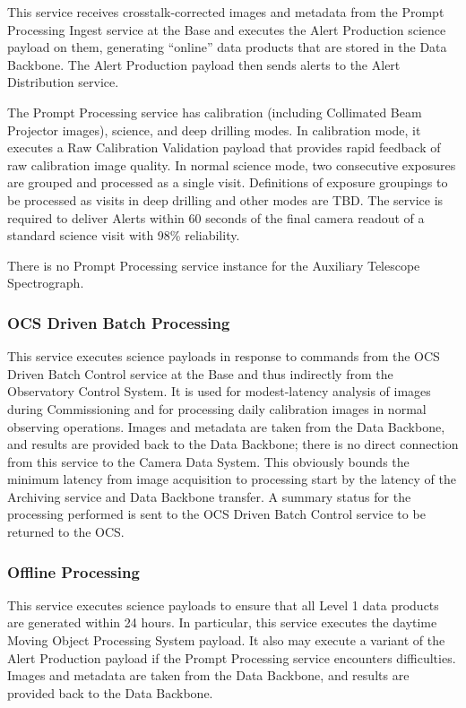 \documentclass[DM,toc]{lsstdoc}
\begin{document}
This service receives crosstalk-corrected images and metadata from the
Prompt Processing Ingest service at the Base and executes the Alert
Production science payload on them, generating ``online'' data products
that are stored in the Data Backbone. The Alert Production payload then
sends alerts to the Alert Distribution service.

The Prompt Processing service has calibration (including Collimated Beam
Projector images), science, and deep drilling modes. In calibration
mode, it executes a Raw Calibration Validation payload that provides
rapid feedback of raw calibration image quality. In normal science mode,
two consecutive exposures are grouped and processed as a single visit.
Definitions of exposure groupings to be processed as visits in deep
drilling and other modes are TBD. The service is required to deliver
Alerts within 60 seconds of the final camera readout of a standard
science visit with 98\% reliability.

There is no Prompt Processing service instance for the Auxiliary
Telescope Spectrograph.

\subsubsection{OCS Driven Batch
Processing}\label{ocs-driven-batch-processing}

This service executes science payloads in response to commands from the
OCS Driven Batch Control service at the Base and thus indirectly from
the Observatory Control System. It is used for modest-latency analysis
of images during Commissioning and for processing daily calibration
images in normal observing operations. Images and metadata are taken
from the Data Backbone, and results are provided back to the Data
Backbone; there is no direct connection from this service to the Camera
Data System. This obviously bounds the minimum latency from image
acquisition to processing start by the latency of the Archiving service
and Data Backbone transfer. A summary status for the processing
performed is sent to the OCS Driven Batch Control service to be returned
to the OCS.

\subsubsection{Offline Processing}\label{offline-processing}

This service executes science payloads to ensure that all Level 1 data
products are generated within 24 hours. In particular, this service
executes the daytime Moving Object Processing System payload. It also
may execute a variant of the Alert Production payload if the Prompt
Processing service encounters difficulties. Images and metadata are
taken from the Data Backbone, and results are provided back to the Data
Backbone.
\end{document}
